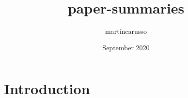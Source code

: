 \documentclass{article}
\title{paper-summaries}
\author{martincarusso }
\date{September 2020}
\begin{document}
\maketitle

\section{Introduction}
\end{document}
